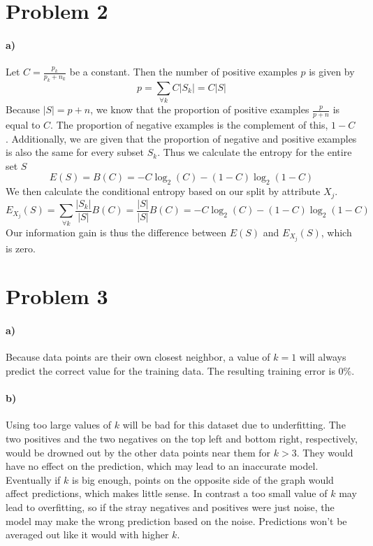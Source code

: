 \documentclass[12pt]{article}
\begin{document}
\section*{Problem 2}

\paragraph{a)}

Let \(C=\frac{p_k}{p_k+n_k}\) be a constant. Then the number of positive examples \(p\) is given by
\[p=\sum_{\forall k} C|S_k|=C|S|\]
Because \(|S|=p+n\), we know that the proportion of positive examples \(\frac{p}{p+n}\) is equal to \(C\). The proportion
of negative examples is the complement of this, \(1-C\). Additionally, we are given that the proportion of negative
and positive examples is also the same for every subset \(S_k\). Thus we calculate the entropy for the entire set \(S\)
\[E(S)=B(C)=-C\log_2(C)-(1-C)\log_2(1-C)\]
We then calculate the conditional entropy based on our split by attribute \(X_j\).
\[E_{X_j}(S)=\sum_{\forall k} \frac{|S_k|}{|S|} B(C)=\frac{|S|}{|S|}B(C)=-C\log_2(C)-(1-C)\log_2(1-C)\]
Our information gain is thus the difference between \(E(S)\) and \(E_{X_j}(S)\), which is zero.

\section*{Problem 3}

\paragraph{a)}

Because data points are their own closest neighbor, a value of \(k=1\) will always predict the correct value for the training data.
The resulting training error is \(0\%\).

\paragraph{b)}

Using too large values of \(k\) will be bad for this dataset due to underfitting. The two positives and the two negatives on the top left
and bottom right, respectively, would be drowned out by the other data points near them for \(k>3\). They would have no effect on the prediction,
which may lead to an inaccurate model. Eventually if \(k\) is big enough, points on the opposite side of the graph would affect predictions, which makes little sense.
In contrast a too small value of \(k\) may lead to overfitting, so if the stray negatives and positives were just noise, the model
may make the wrong prediction based on the noise. Predictions won't be averaged out like it would with higher \(k\).
\end{document}
